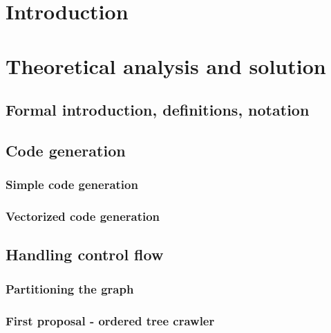 \chapter{Introduction}
  
\chapter{Theoretical analysis and solution}

    \label{ch:analysis}

    \section{Formal introduction, definitions, notation} 

    \section{Code generation} 


        \subsection{Simple code generation}  %

        \subsection{Vectorized code generation} 

    \section{Handling control flow} 

        \subsection{Partitioning the graph} 

        \subsection{First proposal - ordered tree crawler} 

